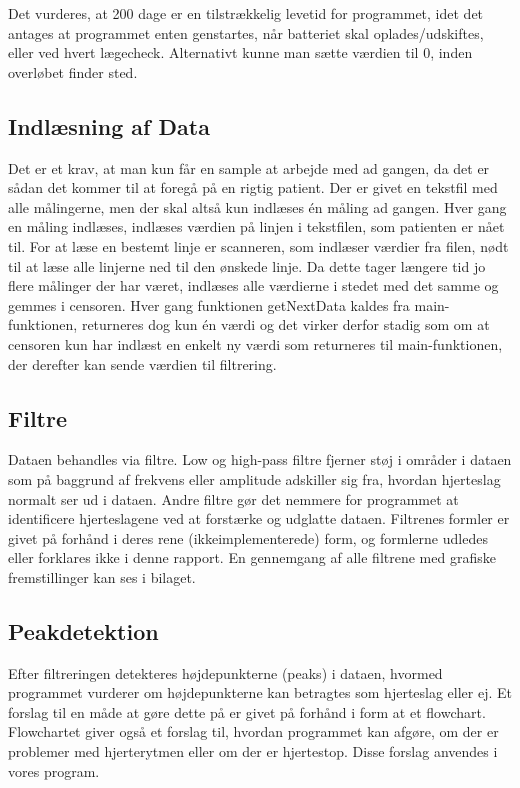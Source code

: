 \documentclass{article}
\begin{document}
Det vurderes, at 200 dage er en tilstrækkelig levetid for programmet, idet det antages at programmet enten genstartes, når batteriet skal oplades/udskiftes, eller ved hvert lægecheck. Alternativt kunne man sætte værdien til 0, inden overløbet finder sted.

\subsection{Indlæsning af Data}
Det er et krav, at man kun får en sample at arbejde med ad gangen, da det er sådan det kommer til at foregå på en rigtig patient. Der er givet en tekstfil med alle målingerne, men der skal altså kun indlæses én måling ad gangen. Hver gang en måling indlæses, indlæses værdien på linjen i tekstfilen, som patienten er nået til. For at læse en bestemt linje er scanneren, som indlæser værdier fra filen, nødt til at læse alle linjerne ned til den ønskede linje. Da dette tager længere tid jo flere målinger der har været, indlæses alle værdierne i stedet med det samme og gemmes i censoren. Hver gang funktionen getNextData kaldes fra main-funktionen, returneres dog kun én værdi og det virker derfor stadig som om at censoren kun har indlæst en enkelt ny værdi som returneres til main-funktionen, der derefter kan sende værdien til filtrering.

\subsection{Filtre}
Dataen behandles via filtre. Low og high-pass filtre fjerner støj i områder i dataen som på baggrund af frekvens eller amplitude adskiller sig fra, hvordan hjerteslag normalt ser ud i dataen. Andre filtre gør det nemmere for programmet at identificere hjerteslagene ved at forstærke og udglatte dataen. Filtrenes formler er givet på forhånd i deres rene (ikkeimplementerede) form, og formlerne udledes eller forklares ikke i denne rapport. En gennemgang af alle filtrene med grafiske fremstillinger kan ses i bilaget.

\subsection{Peakdetektion}
Efter filtreringen detekteres højdepunkterne (peaks) i dataen, hvormed programmet vurderer om højdepunkterne kan betragtes som hjerteslag eller ej. Et forslag til en måde at gøre dette på er givet på forhånd i form at et flowchart. Flowchartet giver også et forslag til, hvordan programmet kan afgøre, om der er problemer med hjerterytmen eller om der er hjertestop. Disse forslag anvendes i vores program.
\end{document}
